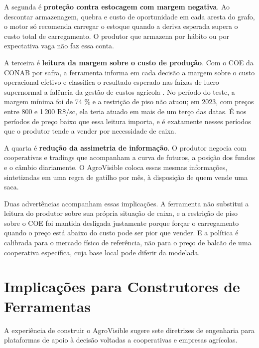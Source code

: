 A segunda é \textbf{proteção contra estocagem com margem negativa}. Ao descontar armazenagem, quebra e custo de oportunidade em cada aresta do grafo, o motor só recomenda carregar o estoque quando a deriva esperada supera o custo total de carregamento. O produtor que armazena por hábito ou por expectativa vaga não faz essa conta.

A terceira é \textbf{leitura da margem sobre o custo de produção}. Com o COE da CONAB por safra, a ferramenta informa em cada decisão a margem sobre o custo operacional efetivo e classifica o resultado esperado nas faixas de lucro supernormal a falência da gestão de custos agrícola \cite{AgroSafety2026}. No período do teste, a margem mínima foi de 74 \% e a restrição de piso não atuou; em 2023, com preços entre 800 e 1\,200 R\$/sc, ela teria atuado em mais de um terço das datas. É nos períodos de preço baixo que essa leitura importa, e é exatamente nesses períodos que o produtor tende a vender por necessidade de caixa.

A quarta é \textbf{redução da assimetria de informação}. O produtor negocia com cooperativas e tradings que acompanham a curva de futuros, a posição dos fundos e o câmbio diariamente. O AgroVisible coloca essas mesmas informações, sintetizadas em uma regra de gatilho por mês, à disposição de quem vende uma saca.

Duas advertências acompanham essas implicações. A ferramenta não substitui a leitura do produtor sobre sua própria situação de caixa, e a restrição de piso sobre o COE foi mantida desligada justamente porque forçar o carregamento quando o preço está abaixo do custo pode ser pior que vender. E a política é calibrada para o mercado físico de referência, não para o preço de balcão de uma cooperativa específica, cuja base local pode diferir da modelada.

\section{Implicações para Construtores de Ferramentas}\label{sec2:disc-tools}

A experiência de construir o AgroVisible sugere sete diretrizes de engenharia para plataformas de apoio à decisão voltadas a cooperativas e empresas agrícolas.

